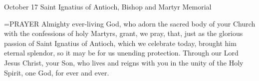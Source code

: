October 17
Saint Ignatius of Antioch, Bishop and Martyr
Memorial

\hangindent=\parindent \small{PRAYER 
Almighty ever-living God,
who adorn the sacred body of your Church
with the confessions of holy Martyrs,
grant, we pray,
that, just as the glorious passion of Saint Ignatius of Antioch,
which we celebrate today,
brought him eternal splendor,
so it may be for us unending protection.
Through our Lord Jesus Christ, your Son,
who lives and reigns with you in the unity of the Holy Spirit,
one God, for ever and ever.\\}
 
